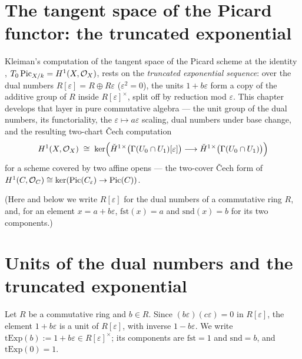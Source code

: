 \section{The tangent space of the Picard functor: the truncated exponential}
\label{pa-chap:Tangent}

Kleiman's computation of the tangent space of the Picard scheme at the identity
\cite{kleiman-picard},
\(T_0 \operatorname{Pic}_{X/k} = H^1(X, \mathcal{O}_{X})\), rests on the
\emph{truncated exponential sequence}: over the dual numbers
\(R[\varepsilon] = R \oplus R\varepsilon\) (\(\varepsilon^2 = 0\)), the units
\(1 + b\varepsilon\) form a copy of the additive group of \(R\) inside
\(R[\varepsilon]^\times\), split off by reduction mod \(\varepsilon\). This chapter
develops that layer in pure commutative algebra --- the unit group of the dual numbers,
its functoriality, the \(\varepsilon \mapsto a\varepsilon\) scaling, dual numbers under
base change, and the resulting two-chart \v{C}ech computation
\[
  H^1(X, \mathcal{O}_{X}) \;\cong\;
    \ker\Bigl( \check{H}^1{}^\times\bigl(\Gamma(U_0 \cap U_1)[\varepsilon]\bigr)
      \longrightarrow \check{H}^1{}^\times\bigl(\Gamma(U_0 \cap U_1)\bigr) \Bigr)
\]
for a scheme covered by two affine opens --- the two-cover \v{C}ech form of
\(H^1(C, \mathcal{O}_{C}) \cong \ker(\operatorname{Pic}(C_\varepsilon) \to \operatorname{Pic}(C))\).

(Here and below we write \(R[\varepsilon]\) for the dual numbers of a commutative ring
\(R\), and, for an element \(x = a + b\varepsilon\), \(\mathrm{fst}(x) = a\) and
\(\mathrm{snd}(x) = b\) for its two components.)

\section{Units of the dual numbers and the truncated exponential}

\begin{definition}
  \label{pa-def:truncExpUnit}
  \leanok

  Let \(R\) be a commutative ring and \(b \in R\). Since
  \((b\varepsilon)(c\varepsilon) = 0\) in \(R[\varepsilon]\), the element
  \(1 + b\varepsilon\) is a unit of \(R[\varepsilon]\), with inverse
  \(1 - b\varepsilon\). We write
  \(\mathrm{tExp}(b) := 1 + b\varepsilon \in R[\varepsilon]^\times\); its components are
  \(\mathrm{fst} = 1\) and \(\mathrm{snd} = b\), and \(\mathrm{tExp}(0) = 1\).
\end{definition}

